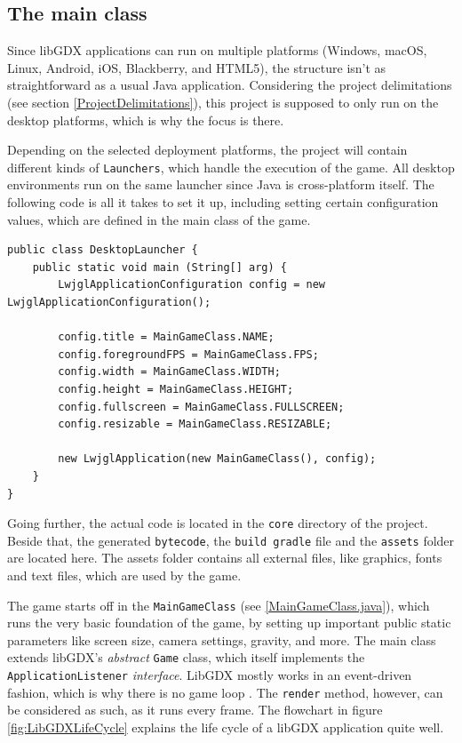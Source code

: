 \documentclass[12p]{article}
\begin{document}

\subsection{The main class} \label{DocMainClass}

Since libGDX applications can run on multiple platforms (Windows, macOS, Linux, Android, iOS, Blackberry, and HTML5), the structure isn't as straightforward as a usual Java application. Considering the project delimitations (see section \ref{ProjectDelimitations}), this project is supposed to only run on the desktop platforms, which is why the focus is there.

Depending on the selected deployment platforms, the project will contain different kinds of \texttt{Launchers}, which handle the execution of the game. All desktop environments run on the same launcher since Java is cross-platform itself. The following code is all it takes to set it up, including setting certain configuration values, which are defined in the main class of the game.

\begin{verbatim}
public class DesktopLauncher {
	public static void main (String[] arg) {
		LwjglApplicationConfiguration config = new LwjglApplicationConfiguration();

		config.title = MainGameClass.NAME;
		config.foregroundFPS = MainGameClass.FPS;
		config.width = MainGameClass.WIDTH;
		config.height = MainGameClass.HEIGHT;
		config.fullscreen = MainGameClass.FULLSCREEN;
		config.resizable = MainGameClass.RESIZABLE;

		new LwjglApplication(new MainGameClass(), config);
	}
}
\end{verbatim}

Going further, the actual code is located in the \texttt{core} directory of the project. Beside that, the generated \texttt{bytecode}, the \texttt{build gradle} file and the \texttt{assets} folder are located here. The assets folder contains all external files, like graphics, fonts and text files, which are used by the game.

The game starts off in the \texttt{MainGameClass} (see \ref{MainGameClass.java}), which runs the very basic foundation of the game, by setting up important public static parameters like screen size, camera settings, gravity, and more. The main class extends libGDX's \emph{abstract} \texttt{Game} class, which itself implements the \texttt{ApplicationListener} \emph{interface}. LibGDX mostly works in an event-driven fashion, which is why there is no game loop \cite{libGDXLifeCycle}. The \texttt{render} method, however, can be considered as such, as it runs every frame. The flowchart in figure \ref{fig:LibGDXLifeCycle} explains the life cycle of a libGDX application quite well.
\end{document}
